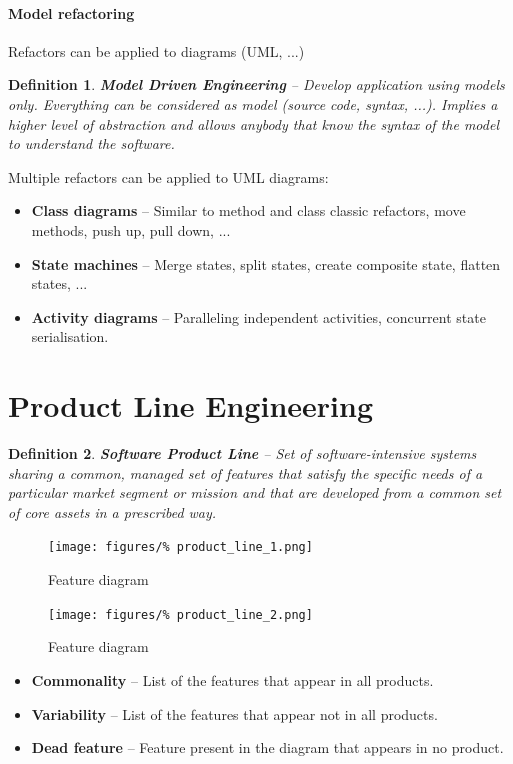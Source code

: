 \documentclass[a4paper,11pt]{report}
\newtheorem{definition}{Definition}
\begin{document}
		\paragraph{Model refactoring}
			Refactors can be applied to diagrams (UML, ...)
			\begin{definition}
				\textbf{Model Driven Engineering} --
					Develop application using models
					only. Everything can be considered
					as model (source code, syntax, ...).
					Implies a higher level of abstraction
					and allows anybody that know the
					syntax of the model to understand 
					the software.					
			\end{definition}\noindent
			Multiple refactors can be applied to UML
				diagrams:
			\begin{itemize}
				\setlength{\itemsep}{0pt}
				\setlength{\parskip}{0pt}
				\setlength{\parsep}{0pt}
				\item \textbf{Class diagrams} -- 
					Similar to method and class
					classic refactors, move methods,
					push up, pull down, ...
				\item \textbf{State machines} -- 
					Merge states, split states,
					create composite state,
					flatten states, ...
				\item \textbf{Activity diagrams} --
					Paralleling independent activities,
					concurrent state serialisation.
			\end{itemize}
%
\section{Product Line Engineering}
	\begin{definition}
		\textbf{Software Product Line} -- 
			Set of software-intensive systems sharing 
			a common, managed set of features that
			satisfy the specific needs of a particular
			market segment or
			mission and that are developed from a common
			set of core assets in a prescribed way.
	\end{definition}
	\begin{figure}[H]
		\centering
		\texttt{[image: figures/\%
			product\_line\_1.png]}
		\caption{Feature diagram}
		\label{fig:feature_diagram:1}
	\end{figure}\noindent
	\begin{figure}[H]
		\centering
		\texttt{[image: figures/\%
			product\_line\_2.png]}
		\caption{Feature diagram}
	\end{figure}\noindent
	\begin{itemize}
		\setlength{\itemsep}{0pt}
		\setlength{\parskip}{0pt}
		\setlength{\parsep}{0pt}
		\item \textbf{Commonality} -- 
			List of the features that appear in all
			products.
		\item \textbf{Variability} -- 
			List of the features that appear not
			in all products.
		\item \textbf{Dead feature} --
			Feature present in the diagram that
			appears in no product.
	\end{itemize}
%
\end{document}
